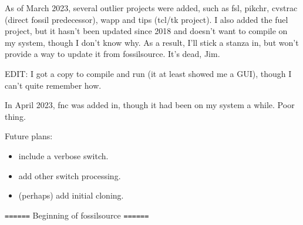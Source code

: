 \documentclass[11pt]{article}
\begin{document}
As of March 2023, several outlier projects were added, such as fsl, pikchr, cvstrac (direct fossil
predecessor), wapp and tips (tcl/tk project). I also added the fuel project, but it hasn't been
updated since 2018 and doesn't want to compile on my system, though I don't know why. As a result,
I'll stick a stanza in, but won't provide a way to update it from fossilsource. It's dead, Jim.

EDIT: I got a copy to compile and run (it at least showed me a GUI), though I can't quite remember
how.

In April 2023, fnc was added in, though it had been on my system a while. Poor thing.

Future plans: 
\begin{itemize}
\item include a verbose switch.
\item add other switch processing.
\item (perhaps) add initial cloning.
\end{itemize}

\texttt{======} Beginning of fossilsource \texttt{======}
\end{document}
